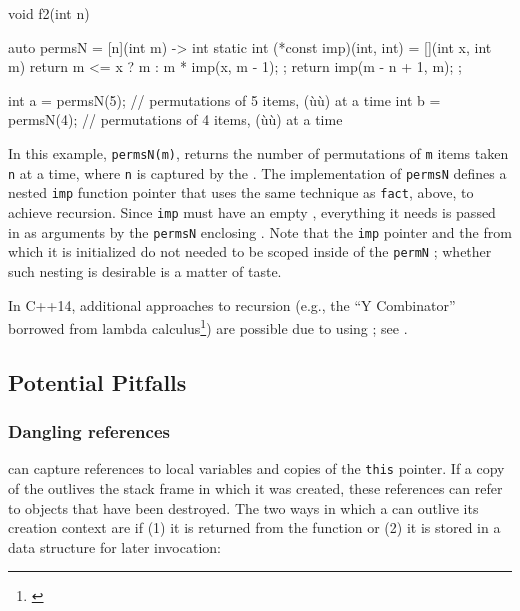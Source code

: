 \begin{emcppslisting}
void f2(int n)
{
    auto permsN = [n](int m) -> int
    {
        static int (*const imp)(int, int) = [](int x, int m) {
            return m <= x ? m : m * imp(x, m - 1);
        };
        return imp(m - n + 1, m);
    };

    int a = permsN(5);  // permutations of 5 items, (ù{}ù) at a time
    int b = permsN(4);  // permutations of 4 items, (ù{}ù) at a time
}
\end{emcppslisting}
    

In this example, \lstinline!permsN(m)!, returns the number of permutations
of \lstinline!m! items taken \lstinline!n! at a time, where \lstinline!n! is
captured by the . The implementation of
\lstinline!permsN! defines a nested \lstinline!imp! function pointer that uses
the same technique as \lstinline!fact!, above, to achieve recursion. Since
\lstinline!imp! must have an empty , everything it
needs is passed in as arguments by the \lstinline!permsN! enclosing
. Note that the \lstinline!imp! pointer and the
 from which it is initialized do not needed to
be scoped inside of the \lstinline!permN! ;
whether such nesting is desirable is a matter of taste.

In C++14, additional approaches to recursion (e.g., the ``Y Combinator''
borrowed from lambda calculus{\cprotect\footnote{\cite{derevenets16}}}) are possible due to
using ; see .

\subsection[Potential Pitfalls]{Potential Pitfalls}\label{potential-pitfalls-lambda}

\subsubsection[Dangling references]{Dangling references}\label{dangling-references}

 can capture references to local variables and
copies of the \lstinline!this! pointer. If a copy of the  outlives the stack frame in which it was created, these
references can refer to objects that have been destroyed. The two ways
in which a  can outlive its creation context are
if (1) it is returned from the function or (2) it is stored in a data
structure for later invocation:

